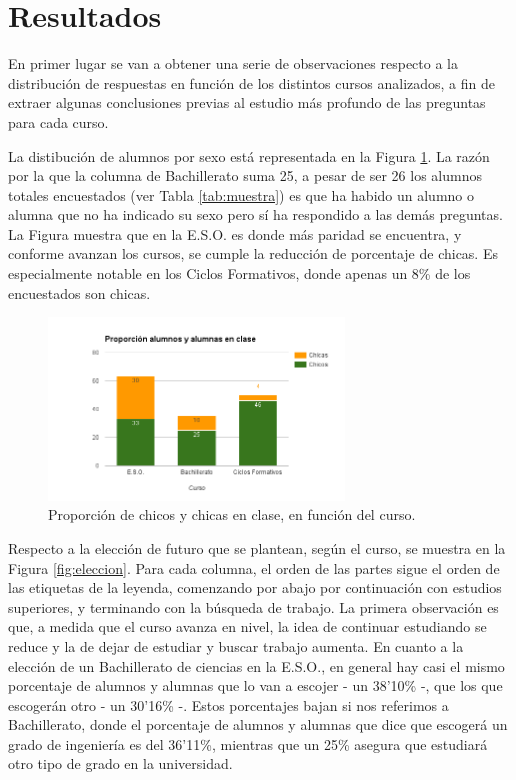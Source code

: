 \documentclass[runningheads,a4paper]{llncs}
\begin{document}
\section{Resultados}
\label{sec:resultados}

En primer lugar se van a obtener una serie de observaciones respecto a la distribución de respuestas en función de los distintos cursos analizados, a fin de extraer algunas conclusiones previas al estudio más profundo de las preguntas para cada curso.

La distibución de alumnos por sexo está representada en la Figura \ref{fig:alumnos_as}. La razón por la que la columna de Bachillerato suma 25, a pesar de ser 26 los alumnos totales encuestados (ver Tabla \ref{tab:muestra}) es que ha habido un alumno o alumna que no ha indicado su sexo pero sí ha respondido a las demás preguntas. La Figura muestra que en la E.S.O. es donde más paridad se encuentra, y conforme avanzan los cursos, se cumple la reducción de porcentaje de chicas. Es especialmente notable en los Ciclos Formativos, donde apenas un 8\% de los encuestados son chicas.

\begin{figure}
  \begin{center}
    \includegraphics[width=0.7\textwidth]{Bitmap/alumnos_as.png}
    \caption{{\scriptsize Proporción de chicos y chicas en clase, en función del curso.}}
    \label{fig:alumnos_as}
  \end{center}
\end{figure}

Respecto a la elección de futuro que se plantean, según el curso, se muestra en la Figura \ref{fig:eleccion}. Para cada columna, el orden de las partes sigue el orden de las etiquetas de la leyenda, comenzando por abajo por continuación con estudios superiores, y terminando con la búsqueda de trabajo. La primera observación es que, a medida que el curso avanza en nivel, la idea de continuar estudiando se reduce y la de dejar de estudiar y buscar trabajo aumenta. En cuanto a la elección de un Bachillerato de ciencias en la E.S.O., en general hay casi el mismo porcentaje de alumnos y alumnas que lo van a escojer - un 38'10\% -, que los que escogerán otro - un 30'16\% -. Estos porcentajes bajan si nos referimos a Bachillerato, donde el porcentaje de alumnos y alumnas que dice que escogerá un grado de ingeniería es del 36'11\%, mientras que un 25\% asegura que estudiará otro tipo de grado en la universidad.
\end{document}
